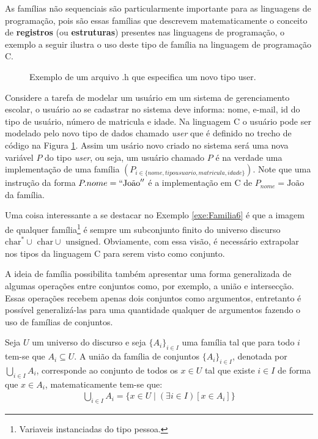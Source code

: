 As famílias não sequenciais são particularmente importante para as linguagens de programação, pois são essas famílias que descrevem matematicamente o conceito de \textbf{registros} (ou \textbf{estruturas}) presentes nas linguagens de programação, o exemplo a seguir ilustra o uso deste tipo de família na linguagem de programação C.

\begin{figure}[h]
	
	\caption{Exemplo de um arquivo .h que especifica um novo tipo user.}
	\label{fig:FamiliaEmC}
\end{figure}

\begin{exemplo}\label{exe:Familia6}
	Considere a tarefa de modelar um usuário em um sistema de gerenciamento escolar, o usuário ao se cadastrar no sistema deve informa: nome, e-mail, id do tipo de usuário, número de matricula e idade. Na linguagem C o usuário pode ser modelado pelo novo tipo de dados chamado \textit{user} que é definido no trecho de código na Figura \ref{fig:FamiliaEmC}. Assim um usário novo criado no sistema será uma nova variável $P$ do tipo \textit{user}, ou seja, um usuário chamado $P$ é na verdade uma implementação de uma família $(P_{i \in \{nome, tipousuario, matricula, idade\}})$. Note que uma instrução da forma $P.nome = ``\text{João}''$ é a implementação em C de $P_{nome} = \text{João}$ da família.
\end{exemplo}

\begin{nota}
	Uma coisa interessante a se destacar no Exemplo \ref{exe:Familia6} é que a imagem de qualquer família\footnote{Variaveis instanciadas do tipo pessoa.} é sempre um subconjunto finito do universo discurso $\text{char}^* \cup \text{ char} \cup \text{ unsigned}$. Obviamente, com essa visão, é necessário extrapolar nos tipos da linguagem C para serem visto como conjunto.
\end{nota}

A ideia de família possibilita também apresentar uma forma generalizada de algumas operações entre conjuntos como, por exemplo, a união e intersecção. Essas operações recebem apenas dois conjuntos como argumentos, entretanto é possível generalizá-las para uma quantidade qualquer de argumentos fazendo o uso de famílias de conjuntos.

\begin{definicao}\label{def:UniaoGeneralizada}
	Seja $U$ um universo do discurso e seja $\{{A_i}\}_{i \in I}$ uma família tal que para todo $i$ tem-se que $A_i \subseteq U$. A união da família de conjuntos $\{{A_i}\}_{i \in I}$, denotada por $\bigcup_{i \in I} A_i$, corresponde ao conjunto de todos os $x \in U$ tal que existe $i \in I$ de forma que $x \in A_i$, matematicamente tem-se que:
	\begin{eqnarray*}
		\bigcup_{i \in I} A_i = \{x \in U \mid (\exists i \in I)[x \in A_i]\}
	\end{eqnarray*}
\end{definicao}

